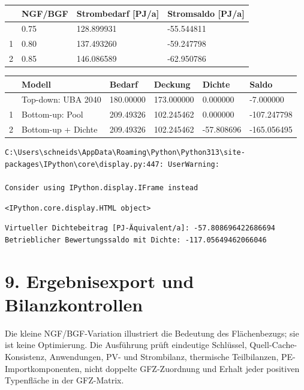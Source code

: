 \documentclass[
  ngerman,
  a4paper,
  DIV=11]{scrreprt}
\newcounter{none} %
\begin{document}
{\def\LTcaptype{none} %
\begin{longtable}[]{@{}llll@{}}
\toprule\noalign{}
& NGF/BGF & Strombedarf {[}PJ/a{]} & Stromsaldo {[}PJ/a{]} \\
\midrule\noalign{}
\endhead
\bottomrule\noalign{}
\endlastfoot
0 & 0.75 & 128.899931 & -55.544811 \\
1 & 0.80 & 137.493260 & -59.247798 \\
2 & 0.85 & 146.086589 & -62.950786 \\
\end{longtable}
}

{\def\LTcaptype{none} %
\begin{longtable}[]{@{}llllll@{}}
\toprule\noalign{}
& Modell & Bedarf & Deckung & Dichte & Saldo \\
\midrule\noalign{}
\endhead
\bottomrule\noalign{}
\endlastfoot
0 & Top-down: UBA 2040 & 180.00000 & 173.000000 & 0.000000 &
-7.000000 \\
1 & Bottom-up: Pool & 209.49326 & 102.245462 & 0.000000 & -107.247798 \\
2 & Bottom-up + Dichte & 209.49326 & 102.245462 & -57.808696 &
-165.056495 \\
\end{longtable}
}

\begin{verbatim}
C:\Users\schneids\AppData\Roaming\Python\Python313\site-packages\IPython\core\display.py:447: UserWarning:

Consider using IPython.display.IFrame instead
\end{verbatim}

\begin{verbatim}
<IPython.core.display.HTML object>
\end{verbatim}

\begin{verbatim}
Virtueller Dichtebeitrag [PJ-Äquivalent/a]: -57.808696422686694
Betrieblicher Bewertungssaldo mit Dichte: -117.05649462066046
\end{verbatim}

\section{9. Ergebnisexport und
Bilanzkontrollen}\label{ergebnisexport-und-bilanzkontrollen}

Die kleine NGF/BGF-Variation illustriert die Bedeutung des
Flächenbezugs; sie ist keine Optimierung. Die Ausführung prüft
eindeutige Schlüssel, Quell-Cache-Konsistenz, Anwendungen, PV- und
Strombilanz, thermische Teilbilanzen, PE-Importkomponenten, nicht
doppelte GFZ-Zuordnung und Erhalt jeder positiven Typenfläche in der
GFZ-Matrix.
\end{document}
